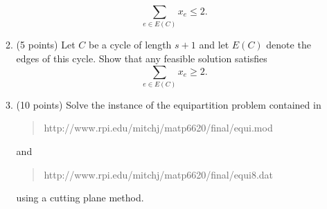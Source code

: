 \begin{enumerate}
\begin{enumerate}
\begin{displaymath}
              \sum_{e \in E(C)} x_e \leq 2.
            \end{displaymath}
         \item (5 points)  \label{cycle}
            Let $C$ be a cycle of length $s+1$ and let $E(C)$ denote the
            edges of this cycle.
            Show that any feasible solution satisfies
            \begin{displaymath}
              \sum_{e \in E(C)} x_e \geq 2.
            \end{displaymath}
         \item (10 points)
            Solve the instance of the equipartition problem contained in
            \begin{quote}
              http://www.rpi.edu/\til mitchj/matp6620/final/equi.mod
            \end{quote}
            and
            \begin{quote}
              http://www.rpi.edu/\til mitchj/matp6620/final/equi8.dat
            \end{quote}
            using a cutting plane method.
       \end{enumerate}


\end{enumerate}
